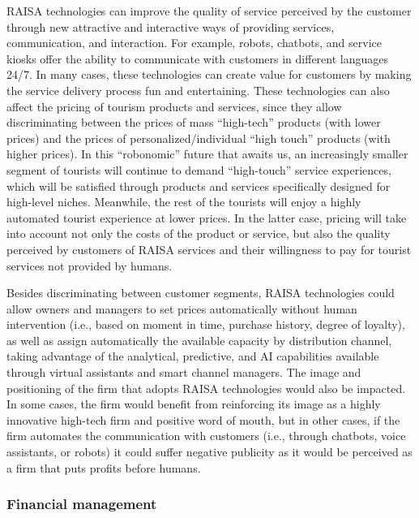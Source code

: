 \documentclass[
  letterpaper,
  DIV=11,
  numbers=noendperiod]{scrreprt}
\begin{document}
RAISA technologies can improve the quality of service perceived by the
customer through new attractive and interactive ways of providing
services, communication, and interaction. For example, robots, chatbots,
and service kiosks offer the ability to communicate with customers in
different languages 24/7. In many cases, these technologies can create
value for customers by making the service delivery process fun and
entertaining. These technologies can also affect the pricing of tourism
products and services, since they allow discriminating between the
prices of mass ``high-tech'' products (with lower prices) and the prices
of personalized/individual ``high touch'' products (with higher prices).
In this ``robonomic'' future that awaits us, an increasingly smaller
segment of tourists will continue to demand ``high-touch'' service
experiences, which will be satisfied through products and services
specifically designed for high-level niches. Meanwhile, the rest of the
tourists will enjoy a highly automated tourist experience at lower
prices. In the latter case, pricing will take into account not only the
costs of the product or service, but also the quality perceived by
customers of RAISA services and their willingness to pay for tourist
services not provided by humans.

Besides discriminating between customer segments, RAISA technologies
could allow owners and managers to set prices automatically without
human intervention (i.e., based on moment in time, purchase history,
degree of loyalty), as well as assign automatically the available
capacity by distribution channel, taking advantage of the analytical,
predictive, and AI capabilities available through virtual assistants and
smart channel managers. The image and positioning of the firm that
adopts RAISA technologies would also be impacted. In some cases, the
firm would benefit from reinforcing its image as a highly innovative
high-tech firm and positive word of mouth, but in other cases, if the
firm automates the communication with customers (i.e., through chatbots,
voice assistants, or robots) it could suffer negative publicity as it
would be perceived as a firm that puts profits before humans.

\hypertarget{financial-management}{%
\subsubsection{Financial management}\label{financial-management}}
\end{document}
